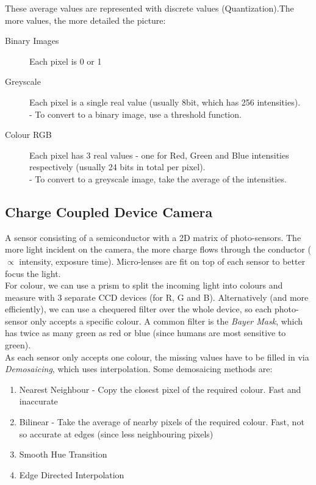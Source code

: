 These average values are represented with discrete values (Quantization).The more values, the more detailed the picture:
\begin{description}
    \item[Binary Images] Each pixel is 0 or 1
    \item[Greyscale] Each pixel is a single real value (usually 8bit, which has 256 intensities). \\ \quad\quad  - To convert to a binary image, use a threshold function.
    \item[Colour RGB] Each pixel has 3  real values - one for Red, Green and Blue intensities respectively (usually 24 bits in total per pixel). \\ \quad\quad  - To convert to a greyscale image, take the average of the intensities.    
\end{description}

\subsection{Charge Coupled Device Camera}
A sensor consisting of a semiconductor with a 2D matrix of photo-sensors. The more light incident on the camera, the more charge flows through the conductor ($\propto$ intensity, exposure time). Micro-lenses are fit on top of each sensor to better focus the light.\\

For colour, we can use a prism to split the incoming light into colours and measure with 3 separate CCD devices (for R, G and B). Alternatively (and more efficiently), we can use a chequered filter over the whole device, so each photo-sensor only accepts a specific colour. A common filter is the \emph{Bayer Mask}, which has twice as many green as red or blue (since humans are most sensitive to green). \\

As each sensor only accepts one colour, the missing values have to be filled in via \emph{Demosaicing}, which uses interpolation. Some demosaicing methods are: 
\begin{enumerate}
    \item Nearest Neighbour - Copy the closest pixel of the required colour. Fast and inaccurate
    \item Bilinear - Take the average of nearby pixels of the required colour. Fast, not so accurate at edges (since less neighbouring pixels)
    \item Smooth Hue Transition
    \item Edge Directed Interpolation
\end{enumerate}

